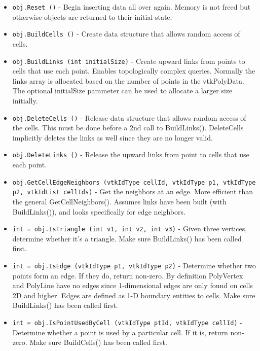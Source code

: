 \begin{itemize}
\item  \verb|obj.Reset ()| -  Begin inserting data all over again. Memory is not freed but otherwise
 objects are returned to their initial state.

\item  \verb|obj.BuildCells ()| -  Create data structure that allows random access of cells.

\item  \verb|obj.BuildLinks (int initialSize)| -  Create upward links from points to cells that use each point. Enables
 topologically complex queries. Normally the links array is allocated
 based on the number of points in the vtkPolyData. The optional 
 initialSize parameter can be used to allocate a larger size initially.

\item  \verb|obj.DeleteCells ()| -  Release data structure that allows random access of the cells. This must
 be done before a 2nd call to BuildLinks(). DeleteCells implicitly deletes
 the links as well since they are no longer valid.

\item  \verb|obj.DeleteLinks ()| -  Release the upward links from point to cells that use each point.

\item  \verb|obj.GetCellEdgeNeighbors (vtkIdType cellId, vtkIdType p1, vtkIdType p2, vtkIdList cellIds)| -  Get the neighbors at an edge. More efficient than the general 
 GetCellNeighbors(). Assumes links have been built (with BuildLinks()), 
 and looks specifically for edge neighbors.

\item  \verb|int = obj.IsTriangle (int v1, int v2, int v3)| -  Given three vertices, determine whether it's a triangle. Make sure 
 BuildLinks() has been called first.

\item  \verb|int = obj.IsEdge (vtkIdType p1, vtkIdType p2)| -  Determine whether two points form an edge. If they do, return non-zero.
 By definition PolyVertex and PolyLine have no edges since 1-dimensional 
 edges are only found on cells 2D and higher. 
 Edges are defined as 1-D boundary entities to cells.
 Make sure BuildLinks() has been called first.

\item  \verb|int = obj.IsPointUsedByCell (vtkIdType ptId, vtkIdType cellId)| -  Determine whether a point is used by a particular cell. If it is, return
 non-zero. Make sure BuildCells() has been called first.


\end{itemize}

